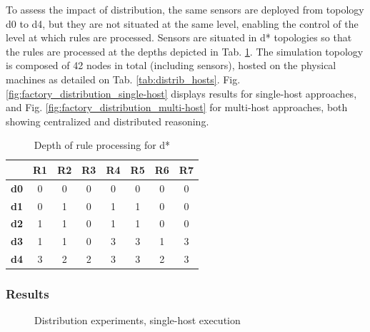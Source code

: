 \documentclass{iosart2c}
\begin{document}
To assess the impact of distribution, the same sensors are deployed from topology d0 to d4, but they are not situated at the same level, enabling the control of the level at which rules are processed.
Sensors are situated in d* topologies so that the rules are processed at the depths depicted in Tab. \ref{tab:factory_distrib_topologies}.
The simulation topology is composed of 42 nodes in total (including sensors), hosted on the physical machines as detailed on Tab. \ref{tab:distrib_hosts}.
Fig. \ref{fig:factory_distribution_single-host} displays results for single-host approaches, and Fig. \ref{fig:factory_distribution_multi-host} for multi-host approaches, both showing centralized and distributed reasoning. 

\begin{table}
	\centering
	\caption{Depth of rule processing for d*}
	\label{tab:factory_distrib_topologies}
	\begin{tabular}{|c|c|c|c|c|c|c|c|}
		\hline
		&\textbf{R1}&\textbf{R2}&\textbf{R3}&\textbf{R4}&\textbf{R5}&\textbf{R6}&\textbf{R7}\\ \hline
		\textbf{d0}& 0& 0& 0& 0& 0& 0& 0\\ \hline
		\textbf{d1}& 0& 1& 0& 1& 1& 0& 0\\ \hline
		\textbf{d2}& 1& 1& 0& 1& 1& 0& 0\\ \hline
		\textbf{d3}& 1& 1& 0& 3& 3& 1& 3\\ \hline
		\textbf{d4}& 3& 2& 2& 3& 3& 2& 3\\ \hline
	\end{tabular}
\end{table}

\subsubsection{Results}

\begin{figure}
	\Centering
	\caption{\Centering Distribution experiments, single-host execution}
	\label{fig:factory_distribution_single-host}
	\begin{minipage}{0.395\textwidth}
		\Centering
		\label{fig:factory_distribution_raw_syn}
		\scalebox{0.8}{
			
		}
	
	\end{minipage}
	\begin{minipage}{0.595\textwidth}
		\Centering
		\label{fig:factory_distribution_processed_syn}
		\scalebox{0.8}{
			
		}
	\end{minipage}
\end{figure}
	
\end{document}
